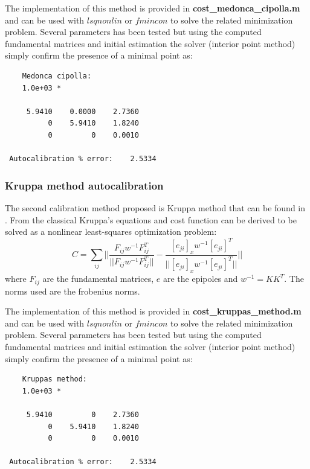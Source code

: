 \documentclass[12pt]{article}
\begin{document}
\bigskip
The implementation of this method is provided in \textbf{cost\_medonca\_cipolla.m} and can be used with $lsqnonlin$ or $fmincon$ to solve the related minimization problem. Several parameters has been tested but using the computed fundamental matrices and initial estimation the solver (interior point method) simply confirm the presence of a minimal point as:
\begin{verbatim}
    Medonca cipolla: 
    1.0e+03 *
 
     5.9410    0.0000    2.7360
          0    5.9410    1.8240
          0         0    0.0010
 
 Autocalibration % error:	 2.5334  
\end{verbatim}
\subsubsection{Kruppa method autocalibration}
The second calibration method proposed is Kruppa method that can be found in \cite{Prapitasari14}. From the classical Kruppa's equations and cost function can be derived to be solved as a nonlinear least-squares optimization problem:
\begin{equation}
    C = \sum_{ij} ||\frac{F_{ij}w^{-1}F_{ij}^T}{||F_{ij}w^{-1}F_{ij}^T||} - \frac{[e_{ji}]_xw^{-1}[e_{ji}]^T}{||[e_{ji}]_xw^{-1}[e_{ji}]^T||}||
\end{equation}
where $F_{ij}$ are the fundamental matrices, $e$ are the epipoles and $w^{-1} = KK^T$. The norms used are the frobenius norms.

\bigskip
The implementation of this method is provided in \textbf{cost\_kruppas\_method.m} and can be used with $lsqnonlin$ or $fmincon$ to solve the related minimization problem. Several parameters has been tested but using the computed fundamental matrices and initial estimation the solver (interior point method) simply confirm the presence of a minimal point as:
\begin{verbatim}
    Kruppas method: 
    1.0e+03 *
 
     5.9410         0    2.7360
          0    5.9410    1.8240
          0         0    0.0010
 
 Autocalibration % error:	 2.5334   
\end{verbatim}
\end{document}
